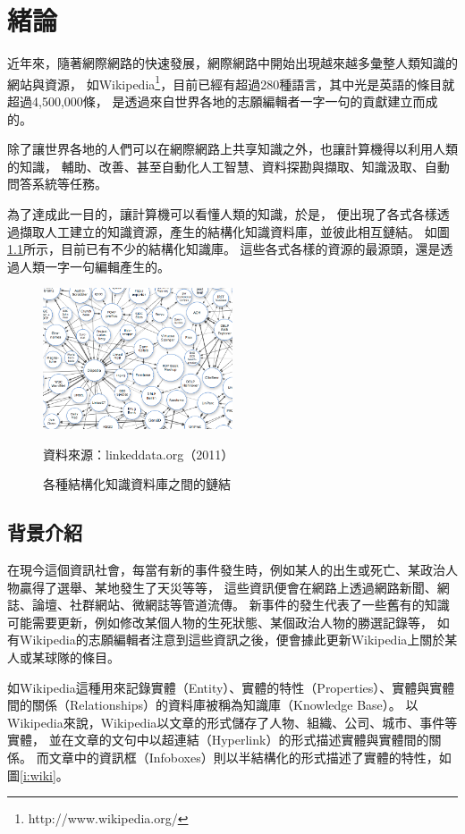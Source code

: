 %
%
%
\chapter{緒論}
\label{c:intro}

近年來，隨著網際網路的快速發展，網際網路中開始出現越來越多彙整人類知識的網站與資源，
如Wikipedia\footnote{http://www.wikipedia.org/}，目前已經有超過280種語言，其中光是英語的條目就超過4,500,000條，
是透過來自世界各地的志願編輯者一字一句的貢獻建立而成的。

除了讓世界各地的人們可以在網際網路上共享知識之外，也讓計算機得以利用人類的知識，
輔助、改善、甚至自動化人工智慧、資料探勘與擷取、知識汲取、自動問答系統等任務。

為了達成此一目的，讓計算機可以看懂人類的知識，於是，
便出現了各式各樣透過擷取人工建立的知識資源，產生的結構化知識資料庫，並彼此相互鏈結。
如圖\ref{i:lod}所示，目前已有不少的結構化知識庫。
這些各式各樣的資源的最源頭，還是透過人類一字一句編輯產生的。%

\begin{figure}
\centering
\includegraphics[width=0.5\textwidth]{images/01-lod-datasets}
\caption{各種結構化知識資料庫之間的鏈結}
\label{i:lod}
資料來源：linkeddata.org（2011）
\end{figure}

%
%
\section{背景介紹}
在現今這個資訊社會，每當有新的事件發生時，例如某人的出生或死亡、某政治人物贏得了選舉、某地發生了天災等等，
這些資訊便會在網路上透過網路新聞、網誌、論壇、社群網站、微網誌等管道流傳。
新事件的發生代表了一些舊有的知識可能需要更新，例如修改某個人物的生死狀態、某個政治人物的勝選記錄等，
如有Wikipedia的志願編輯者注意到這些資訊之後，便會據此更新Wikipedia上關於某人或某球隊的條目。

如Wikipedia這種用來記錄實體（Entity）、實體的特性（Properties）、實體與實體間的關係（Relationships）的資料庫被稱為知識庫（Knowledge Base）。
以Wikipedia來說，Wikipedia以文章的形式儲存了人物、組織、公司、城市、事件等實體，
並在文章的文句中以超連結（Hyperlink）的形式描述實體與實體間的關係。
而文章中的資訊框（Infoboxes）則以半結構化的形式描述了實體的特性，如圖\ref{i:wiki}。

